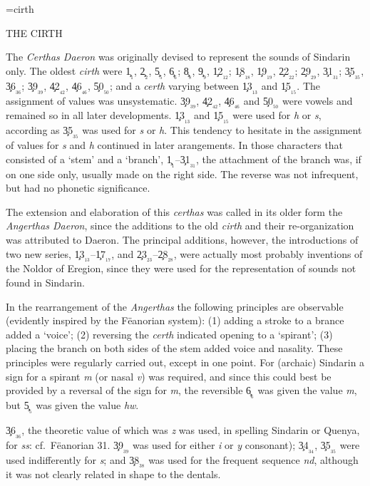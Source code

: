 \font\cirth=cirth

\def\nj{n$\!\!$\j}
\def\C#1{\c{#1}$_{_{#1}}$}
\def\bs{$\backslash$}
\baselineskip=18pt

\begin{center}
THE CIRTH
\end{center}

\noindent
The {\sl Certhas Daeron} was originally devised to represent the sounds
of Sindarin only. The oldest {\sl cirth} were \C{1}, \C{2}, \C{5}, \C{6};
\C{8}, \C{9}, \C{12}; \C{18}, \C{19}, \C{22}; \C{29}, \C{31}; \C{35},
\C{36}; \C{39}, \C{42}, \C{46}, \C{50}; and a {\sl certh} varying
between \C{13} and \C{15}. The assignment of values was unsystematic.
\C{39}, \C{42}, \C{46} and \C{50} were vowels and remained so in all later
developments. \C{13} and \C{15} were used for {\sl h} or {\sl s}, according
as \C{35} was used for {\sl s} or {\sl h}. This tendency to hesitate
in the assignment of values for {\sl s} and {\sl h} continued in
later arangements. In those characters that consisted of a
`stem' and a `branch', \C{1}--\C{31}, the attachment of the branch was,
if on one side only, usually made on the right side.
The reverse was not infrequent, but had no phonetic significance.

The extension and elaboration of this {\sl certhas} was called in its older
form the {\sl Angerthas Daeron}, since the additions to the old {\sl cirth}
and their re-organization was attributed to Daeron. The principal additions,
however, the introductions of two new series, \C{13}--\C{17}, and 
\C{23}--\C{28}, were actually most probably inventions of the Noldor of 
Eregion, since they were used for the representation of sounds not found
in Sindarin.

In the rearrangement of the {\sl Angerthas} the following principles
are observable (evidently inspired by the F\"eanorian system):
(1) adding a stroke to a brance added a `voice';
(2) reversing the {\sl certh} indicated opening to a `spirant';
(3) placing the branch on both sides of the stem added voice and
nasality.
These principles were regularly carried out, except in one point.
For (archaic) Sindarin a sign for a spirant {\sl m} (or nasal {\sl v})
was required, and since this could best be provided by a reversal of the sign
for {\sl m}, the reversible \C{6} was given the value {\sl m}, but \C{5}
was given the value {\sl hw}.

\C{36}, the theoretic value of which was {\sl z} was used, in spelling
Sindarin or Quenya, for {\sl ss}: cf.\ F\"eanorian 31. \C{39} was used for
either {\sl i} or {\sl y} consonant); \C{34}, \C{35} were used indifferently
for {\sl s}; and \C{38} was used for the frequent sequence {\sl nd}, although
it was not clearly related in shape to the dentals.


